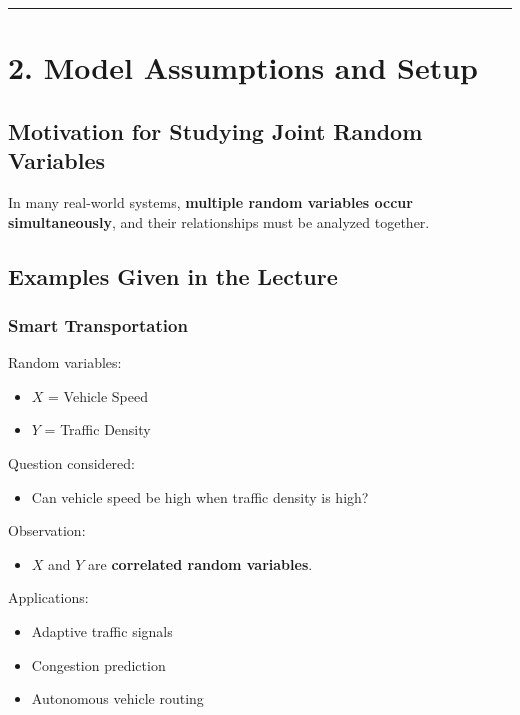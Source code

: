 \documentclass[12pt]{article}
\begin{document}
\hrule
\vspace{0.5cm}

\section*{2. Model Assumptions and Setup}

\subsection*{Motivation for Studying Joint Random Variables}

In many real-world systems, \textbf{multiple random variables occur simultaneously}, and their relationships must be analyzed together.

\subsection*{Examples Given in the Lecture}

\subsubsection*{Smart Transportation}

Random variables:

\begin{itemize}
\item $X$ = Vehicle Speed
\item $Y$ = Traffic Density
\end{itemize}

Question considered:

\begin{itemize}
\item Can vehicle speed be high when traffic density is high?
\end{itemize}

Observation:

\begin{itemize}
\item $X$ and $Y$ are \textbf{correlated random variables}.
\end{itemize}

Applications:

\begin{itemize}
\item Adaptive traffic signals
\item Congestion prediction
\item Autonomous vehicle routing
\end{itemize}
\end{document}
